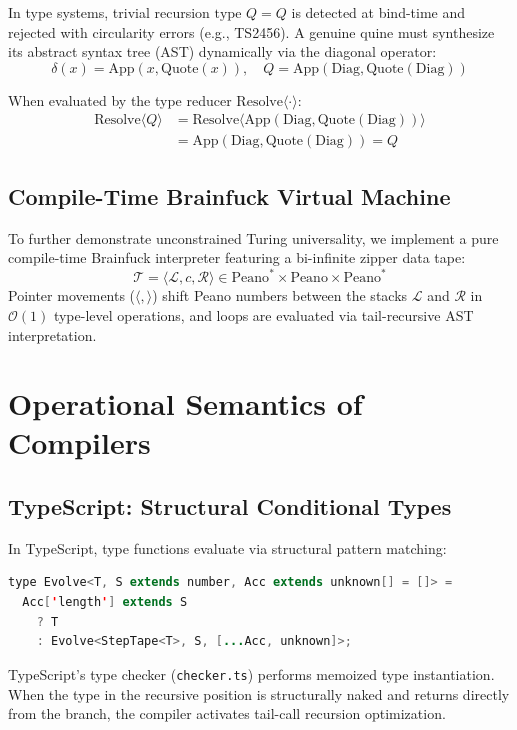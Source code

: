\documentclass[10pt,journal,compsoc]{IEEEtran}
\begin{document}
In type systems, trivial recursion $\text{type } Q = Q$ is detected at bind-time and rejected with circularity errors (e.g., TS2456). A genuine quine must synthesize its abstract syntax tree (AST) dynamically via the diagonal operator:
\begin{equation}
\delta(x) = \text{App}(x, \text{Quote}(x)), \quad Q = \text{App}(\text{Diag}, \text{Quote}(\text{Diag}))
\end{equation}

When evaluated by the type reducer $\text{Resolve}\langle \cdot \rangle$:
\begin{align}
\text{Resolve}\langle Q \rangle &= \text{Resolve}\langle \text{App}(\text{Diag}, \text{Quote}(\text{Diag})) \rangle \nonumber \\
&= \text{App}(\text{Diag}, \text{Quote}(\text{Diag})) = Q
\end{align}

\subsection{Compile-Time Brainfuck Virtual Machine}
To further demonstrate unconstrained Turing universality, we implement a pure compile-time Brainfuck interpreter featuring a bi-infinite zipper data tape:
\begin{equation}
\mathcal{T} = \langle \mathcal{L}, c, \mathcal{R} \rangle \in \text{Peano}^* \times \text{Peano} \times \text{Peano}^*
\end{equation}
Pointer movements ($\langle, \rangle$) shift Peano numbers between the stacks $\mathcal{L}$ and $\mathcal{R}$ in $\mathcal{O}(1)$ type-level operations, and loops are evaluated via tail-recursive AST interpretation.

\section{Operational Semantics of Compilers}

\subsection{TypeScript: Structural Conditional Types}
In TypeScript, type functions evaluate via structural pattern matching:
\begin{lstlisting}[language=Java]
type Evolve<T, S extends number, Acc extends unknown[] = []> =
  Acc['length'] extends S
    ? T
    : Evolve<StepTape<T>, S, [...Acc, unknown]>;
\end{lstlisting}
TypeScript's type checker (\texttt{checker.ts}) performs memoized type instantiation. When the type in the recursive position is structurally naked and returns directly from the branch, the compiler activates tail-call recursion optimization.
\end{document}

